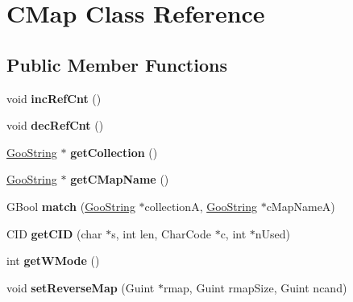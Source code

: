 \hypertarget{class_c_map}{}\section{C\+Map Class Reference}
\label{class_c_map}
\subsection*{Public Member Functions}
\begin{DoxyCompactItemize}
\item 
\mbox{\label{class_c_map_a9ef3c3b6a83488702093c22f6a0dc850}} 
void {\bfseries inc\+Ref\+Cnt} ()
\item 
\mbox{\label{class_c_map_a3bd43a67531d79f0359ec70b4732f443}} 
void {\bfseries dec\+Ref\+Cnt} ()
\item 
\mbox{\label{class_c_map_ac494ef9b1332d53bacfc5d12cbf348ec}} 
\hyperlink{class_goo_string}{Goo\+String} $\ast$ {\bfseries get\+Collection} ()
\item 
\mbox{\label{class_c_map_a8fc7adb0d2329dcb1e85f0818f744a80}} 
\hyperlink{class_goo_string}{Goo\+String} $\ast$ {\bfseries get\+C\+Map\+Name} ()
\item 
\mbox{\label{class_c_map_a779dc00663f4e31edf7013c3d347f0ab}} 
G\+Bool {\bfseries match} (\hyperlink{class_goo_string}{Goo\+String} $\ast$collectionA, \hyperlink{class_goo_string}{Goo\+String} $\ast$c\+Map\+NameA)
\item 
\mbox{\label{class_c_map_a5923dd4335407703a03322efa28fd652}} 
C\+ID {\bfseries get\+C\+ID} (char $\ast$s, int len, Char\+Code $\ast$c, int $\ast$n\+Used)
\item 
\mbox{\label{class_c_map_a5d36ccd0b2960c1dd62c684f6588444c}} 
int {\bfseries get\+W\+Mode} ()
\item 
\mbox{\label{class_c_map_ac0a2c2a24ad48d045d38649f73b0be63}} 
void {\bfseries set\+Reverse\+Map} (Guint $\ast$rmap, Guint rmap\+Size, Guint ncand)
\end{DoxyCompactItemize}
